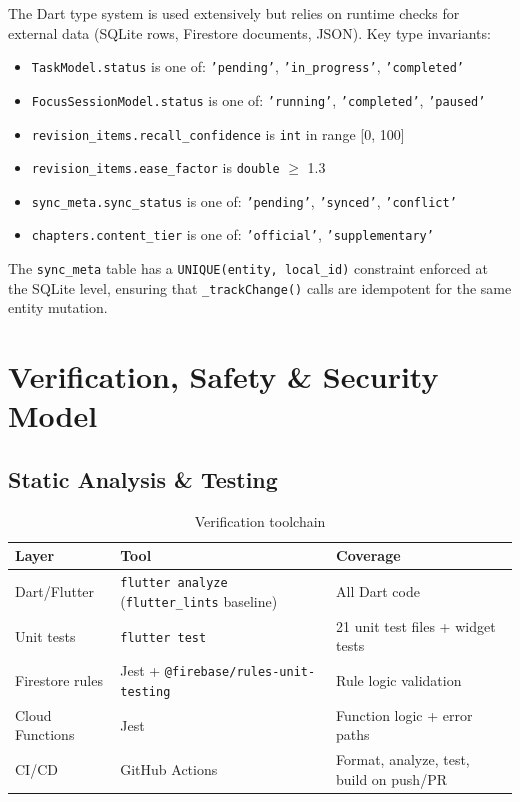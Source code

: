 \documentclass[12pt,a4paper,openany]{report}
\begin{document}
The Dart type system is used extensively but relies on runtime checks for external data (SQLite rows, Firestore documents, JSON). Key type invariants:

\begin{itemize}[leftmargin=*]
  \item \texttt{TaskModel.status} is one of: \texttt{'pending'}, \texttt{'in\_progress'}, \texttt{'completed'}
  \item \texttt{FocusSessionModel.status} is one of: \texttt{'running'}, \texttt{'completed'}, \texttt{'paused'}
  \item \texttt{revision\_items.recall\_confidence} is \texttt{int} in range [0, 100]
  \item \texttt{revision\_items.ease\_factor} is \texttt{double} $\ge$ 1.3
  \item \texttt{sync\_meta.sync\_status} is one of: \texttt{'pending'}, \texttt{'synced'}, \texttt{'conflict'}
  \item \texttt{chapters.content\_tier} is one of: \texttt{'official'}, \texttt{'supplementary'}
\end{itemize}

The \texttt{sync\_meta} table has a \texttt{UNIQUE(entity, local\_id)} constraint enforced at the SQLite level, ensuring that \texttt{\_trackChange()} calls are idempotent for the same entity mutation.

\chapter{Verification, Safety \& Security Model}

\section{Static Analysis \& Testing}

\begin{table}[H]
\centering
\caption{Verification toolchain}
\label{tab:verification}
\begin{tabular}{lll}
\toprule
\textbf{Layer} & \textbf{Tool} & \textbf{Coverage} \\
\midrule
Dart/Flutter & \texttt{flutter analyze} (\texttt{flutter\_lints} baseline) & All Dart code \\
Unit tests & \texttt{flutter test} & 21 unit test files + widget tests \\
Firestore rules & Jest + \texttt{@firebase/rules-unit-testing} & Rule logic validation \\
Cloud Functions & Jest & Function logic + error paths \\
CI/CD & GitHub Actions & Format, analyze, test, build on push/PR \\
\bottomrule
\end{tabular}
\end{table}
\end{document}
